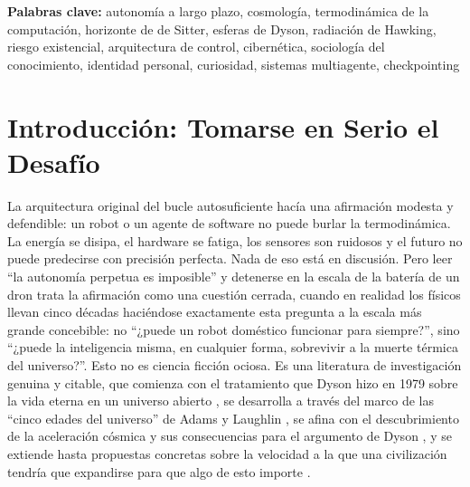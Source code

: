 \documentclass[11pt]{article}
\begin{document}
\begin{abstract}
Sección~\ref{sec:ceiling} no es solo una restricción para las máquinas que cosechen radiación de Hawking en el año $10^{80}$, sino una restricción, ya activa hoy, sobre cuánto del espacio de experiencias humanas posibles merece explorarse, guardarse y bifurcarse hacia adelante, y sobre cómo la propia curiosidad debe racionarse como un recurso sujeto al mismo tipo de presupuesto que limita tanto a las vidas individuales como, en última instancia, al propio universo.
\end{abstract}

\vspace{0.3cm}
\noindent\textbf{Palabras clave:} autonomía a largo plazo, cosmología, termodinámica de la computación, horizonte de de Sitter, esferas de Dyson, radiación de Hawking, riesgo existencial, arquitectura de control, cibernética, sociología del conocimiento, identidad personal, curiosidad, sistemas multiagente, checkpointing

\section{Introducción: Tomarse en Serio el Desafío}
\label{sec:intro}

La arquitectura original del bucle autosuficiente hacía una afirmación modesta y defendible: un robot o un agente de software no puede burlar la termodinámica. La energía se disipa, el hardware se fatiga, los sensores son ruidosos y el futuro no puede predecirse con precisión perfecta. Nada de eso está en discusión. Pero leer ``la autonomía perpetua es imposible'' y detenerse en la escala de la batería de un dron trata la afirmación como una cuestión cerrada, cuando en realidad los físicos llevan cinco décadas haciéndose exactamente esta pregunta a la escala más grande concebible: no ``¿puede un robot doméstico funcionar para siempre?'', sino ``¿puede la inteligencia misma, en cualquier forma, sobrevivir a la muerte térmica del universo?''. Esto no es ciencia ficción ociosa. Es una literatura de investigación genuina y citable, que comienza con el tratamiento que Dyson hizo en 1979 sobre la vida eterna en un universo abierto \citep{dyson1979time}, se desarrolla a través del marco de las ``cinco edades del universo'' de Adams y Laughlin \citep{adams1997dying}, se afina con el descubrimiento de la aceleración cósmica y sus consecuencias para el argumento de Dyson \citep{krauss2000life}, y se extiende hasta propuestas concretas sobre la velocidad a la que una civilización tendría que expandirse para que algo de esto importe \citep{armstrong2013eternity}.
\end{document}
